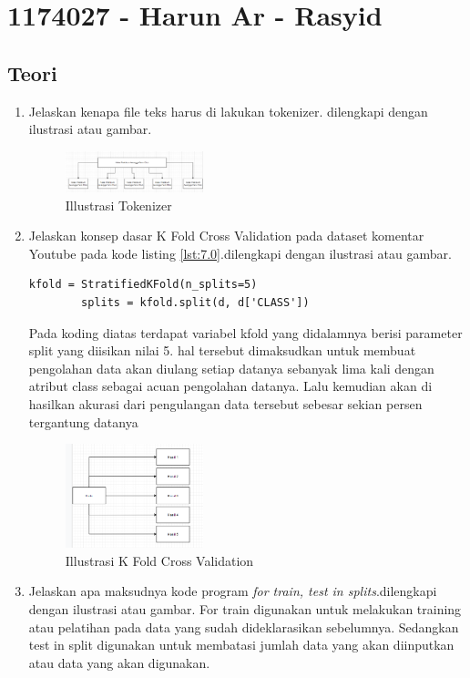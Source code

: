 \section{1174027 - Harun Ar - Rasyid}
\subsection{Teori}
\begin{enumerate}
	\item Jelaskan kenapa file teks harus di lakukan tokenizer. dilengkapi dengan ilustrasi atau gambar. 
	\hfill \break
	\begin{figure}[H]
		\includegraphics[width=4cm]{figures/1174027/7/1.png}
		\centering
		\caption{Illustrasi Tokenizer}
	\end{figure}
	\item Jelaskan konsep dasar K Fold Cross Validation pada dataset komentar Youtube pada kode listing \ref{lst:7.0}.dilengkapi dengan ilustrasi atau gambar.
	\hfill \break
	\begin{lstlisting}[caption=K Fold Cross Validation,label={lst:7.0}]
		kfold = StratifiedKFold(n_splits=5)
		splits = kfold.split(d, d['CLASS'])
	\end{lstlisting}
	Pada koding diatas terdapat variabel kfold yang didalamnya berisi parameter split yang diisikan nilai 5. hal tersebut dimaksudkan untuk membuat pengolahan data akan diulang setiap datanya sebanyak lima kali dengan atribut class sebagai acuan pengolahan datanya. Lalu kemudian akan di hasilkan akurasi dari pengulangan data tersebut sebesar sekian persen tergantung datanya
	\begin{figure}[H]
    	\includegraphics[width=4cm]{figures/1174027/7/2.png}
    	\centering
    	\caption{Illustrasi K Fold Cross Validation}
	\end{figure}
	\item Jelaskan apa maksudnya kode program \emph{for train, test in splits}.dilengkapi dengan ilustrasi atau gambar.
	\hfill \break
	For train digunakan untuk melakukan training atau pelatihan pada data yang sudah dideklarasikan sebelumnya. Sedangkan test in split digunakan untuk membatasi jumlah data yang akan diinputkan atau data yang akan digunakan.

\end{enumerate}
